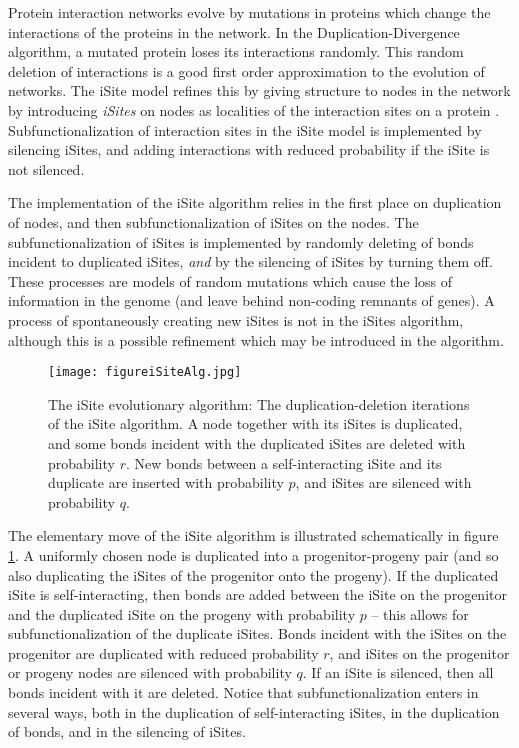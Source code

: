 \documentclass[12pt]{iopart}
\begin{document}
Protein interaction networks evolve by mutations in proteins which change the interactions of
the proteins in the network.  In the Duplication-Divergence algorithm, a mutated protein loses its
interactions randomly.   This random deletion of interactions is a good first order approximation
to the evolution of networks.  The iSite model refines this by giving structure to nodes in the
network by introducing \textit{iSites} on nodes as localities of the interaction sites on a protein
\cite{G11,GG15}. Subfunctionalization of interaction sites in the iSite model is implemented by
silencing iSites, and adding interactions with reduced probability if the iSite is not silenced.

The implementation of the iSite algorithm relies in the first place on duplication of nodes, and
then subfunctionalization of iSites on the nodes.   The subfunctionalization of iSites is implemented
by randomly deleting of bonds incident to duplicated iSites, \textit{and} by the silencing
of iSites by turning them off.  These processes are models of random mutations which cause
the loss of information in the genome (and leave behind non-coding remnants of genes).
A process of spontaneously creating new iSites is not in the iSites algorithm, although this is
a possible refinement which may be introduced in the algorithm.

\begin{figure}[t!]
 \centering
\texttt{[image: figureiSiteAlg.jpg]}
  \caption{{The iSite evolutionary algorithm:}
The duplication-deletion iterations of the iSite algorithm.  A node together
with its iSites is duplicated, and some bonds incident with the duplicated
iSites are deleted with probability $r$.  New bonds between a self-interacting
iSite and its duplicate are inserted with probability $p$, and iSites are
silenced with probability $q$.}
\label{figureiSitealgorithm}
\end{figure}

The elementary move of the iSite algorithm is illustrated schematically in figure
\ref{figureiSitealgorithm}.  A uniformly chosen node is duplicated into a progenitor-progeny 
pair (and so also duplicating the iSites of the progenitor onto the progeny).   
If the duplicated iSite is self-interacting, then bonds are added between the iSite on the 
progenitor and the duplicated iSite on the progeny with probability $p$ -- this allows
for subfunctionalization of the duplicate iSites.  Bonds incident with the iSites on the
progenitor are duplicated with reduced probability $r$, and iSites on the progenitor or 
progeny nodes are silenced with probability $q$.  If an iSite is silenced, then all bonds
incident with it are deleted.  Notice that subfunctionalization enters in several ways,
both in the duplication of self-interacting iSites, in the duplication of bonds, and in
the silencing of iSites.
\end{document}
